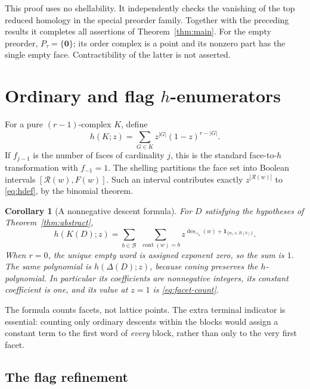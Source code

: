 \documentclass[11pt]{article}
\numberwithin{equation}{section}
\newtheorem{corollary}[theorem]{Corollary}
\theoremstyle{definition}
\theoremstyle{remark}
\newcommand{\zero}{\mathbf 0}
\newcommand{\B}{\mathcal B}
\newcommand{\des}{\operatorname{des}}
\newcommand{\cont}{\operatorname{cont}}
\newcommand{\ind}{\mathbf 1}
\begin{document}
This proof uses no shellability. It independently checks the vanishing of the
top reduced homology in the special preorder family. Together with the
preceding results it completes all assertions of Theorem~\ref{thm:main}.
For the empty preorder, $P_\tau=\{\zero\}$; its order complex is a point and
its nonzero part has the single empty face. Contractibility of the latter is
not asserted.

\section{Ordinary and flag \texorpdfstring{$h$}{h}-enumerators}
\label{sec:enumeration}

For a pure $(r-1)$-complex $K$, define
\begin{equation}
 h(K;z)=\sum_{G\in K}z^{|G|}(1-z)^{r-|G|}.
 \label{eq:hdef}
\end{equation}
If $f_{j-1}$ is the number of faces of cardinality $j$, this is the standard
face-to-$h$ transformation with $f_{-1}=1$. The shelling partitions the face
set into Boolean intervals $[\mathcal R(w),F(w)]$. Such an interval
contributes exactly $z^{|\mathcal R(w)|}$ to \eqref{eq:hdef}, by the binomial
theorem.

\begin{corollary}[A nonnegative descent formula]
\label{cor:hformula}
For $D$ satisfying the hypotheses of Theorem~\ref{thm:abstract},
\begin{equation}
 \boxed{\quad h(K(D);z)=
 \sum_{b\in\B}\ \sum_{\cont(w)=b}
 z^{\des_{\prec_b}(w)+\ind_{\{w_r\in R(b)\}}}.\quad}
 \label{eq:hformula}
\end{equation}
When $r=0$, the unique empty word is assigned exponent zero, so the sum is
$1$. The same polynomial is $h(\Delta(D);z)$, because coning preserves the
$h$-polynomial. In particular its coefficients are nonnegative integers,
its constant coefficient is one, and its value at $z=1$ is \eqref{eq:facet-count}.
\end{corollary}

The formula counts facets, not lattice points. The extra terminal indicator
is essential: counting only ordinary descents within the blocks would assign
a constant term to the first word of \emph{every} block, rather than only to
the very first facet.

\subsection{The flag refinement}
\end{document}
